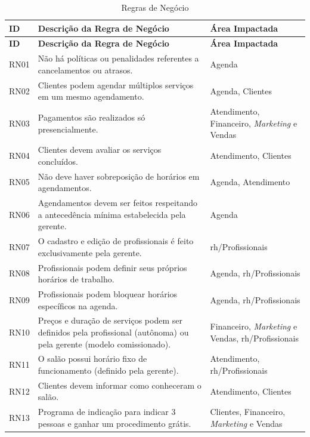 \begin{longtable}{|p{1.2cm}|p{10cm}|p{4cm}|}
	\caption{Regras de Negócio} \label{tab:regras_de_negócio}\\
	\hline
	\textbf{ID} & \textbf{Descrição da Regra de Negócio} & \textbf{Área Impactada} \\
	\hline
	\endfirsthead
	
	\hline
	\textbf{ID} & \textbf{Descrição da Regra de Negócio} & \textbf{Área Impactada} \\
	\hline
	\endhead
	
	RN01 & Não há políticas ou penalidades referentes a cancelamentos ou atrasos. & Agenda \\
	\hline
	RN02 & Clientes podem agendar múltiplos serviços em um mesmo agendamento. & Agenda, Clientes \\
	\hline
	RN03 & Pagamentos são realizados só presencialmente. & Atendimento, Financeiro, \emph{Marketing} e Vendas \\
	\hline
	RN04 & Clientes devem avaliar os serviços concluídos. & Atendimento, Clientes \\
	\hline
	RN05 & Não deve haver sobreposição de horários em agendamentos. & Agenda, Atendimento \\
	\hline
	RN06 & Agendamentos devem ser feitos respeitando a antecedência mínima estabelecida pela gerente. & Agenda \\
	\hline
	RN07 & O cadastro e edição de profissionais é feito exclusivamente pela gerente. & \gls{rh}/Profissionais \\
	\hline
	RN08 & Profissionais podem definir seus próprios horários de trabalho. & Agenda, \gls{rh}/Profissionais \\
	\hline
	RN09 & Profissionais podem bloquear horários específicos na agenda. & Agenda, \gls{rh}/Profissionais \\
	\hline
	RN10 & Preços e duração de serviços podem ser definidos pela profissional (autônoma) ou pela gerente (modelo comissionado). & Financeiro, \emph{Marketing} e Vendas, \gls{rh}/Profissionais \\
	\hline
	RN11 & O salão possui horário fixo de funcionamento (definido pela gerente). & Atendimento, \gls{rh}/Profissionais \\
	\hline
	RN12 & Clientes devem informar como conheceram o salão. & Atendimento, Clientes \\
	\hline
	RN13 & Programa de indicação para indicar 3 pessoas e ganhar um procedimento grátis. & Clientes, Financeiro, \emph{Marketing} e Vendas \\

\end{longtable}
